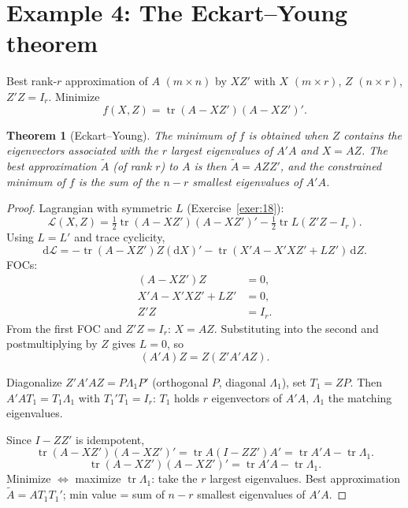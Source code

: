 \documentclass[14pt]{extarticle}
\theoremstyle{plain}
\newtheorem{theorem}{Theorem}
\theoremstyle{definition}
\theoremstyle{remark}
\DeclareMathOperator{\tr}{tr}
\newcommand{\dd}{\mathrm{d}}
\begin{document}
\section{Example 4: The Eckart--Young theorem}\label{sec:15}

Best rank-$r$ approximation of $A$ $(m\times n)$ by $XZ'$ with $X$ $(m\times r)$, $Z$ $(n\times r)$, $Z'Z = I_r$. Minimize
\begin{equation}\label{eq:53}
f(X, Z) = \tr(A - XZ')(A - XZ')'.
\end{equation}

\begin{theorem}[Eckart--Young]\label{thm:ey}
The minimum of $f$ is obtained when $Z$ contains the eigenvectors associated with the $r$ largest eigenvalues of $A'A$ and $X = AZ$. The best approximation $\tilde{A}$ (of rank $r$) to $A$ is then $\tilde{A} = AZZ'$, and the constrained minimum of $f$ is the sum of the $n - r$ smallest eigenvalues of $A'A$.
\end{theorem}

\begin{proof}
Lagrangian with symmetric $L$ (Exercise~\ref{exer:18}):
\begin{equation}\label{eq:54}
\mathcal{L}(X, Z) = \tfrac{1}{2}\tr(A - XZ')(A - XZ')' - \tfrac{1}{2}\tr L(Z'Z - I_r).
\end{equation}
Using $L = L'$ and trace cyclicity,
\[
\dd\mathcal{L} = -\tr(A - XZ')Z(\dd X)' - \tr(X'A - X'XZ' + LZ')\, \dd Z.
\]
FOCs:
\begin{equation}\label{eq:55}
\begin{aligned}
(A - XZ')Z &= 0, \\
X'A - X'XZ' + LZ' &= 0, \\
Z'Z &= I_r.
\end{aligned}
\end{equation}
From the first FOC and $Z'Z = I_r$: $X = AZ$. Substituting into the second and postmultiplying by $Z$ gives $L = 0$, so
\begin{equation}\label{eq:56}
(A'A)Z = Z(Z'A'AZ).
\end{equation}

Diagonalize $Z'A'AZ = P\Lambda_1 P'$ (orthogonal $P$, diagonal $\Lambda_1$), set $T_1 = ZP$. Then $A'AT_1 = T_1\Lambda_1$ with $T_1'T_1 = I_r$: $T_1$ holds $r$ eigenvectors of $A'A$, $\Lambda_1$ the matching eigenvalues.

Since $I - ZZ'$ is idempotent,
\[
\tr(A - XZ')(A - XZ')' = \tr A(I - ZZ')A' = \tr A'A - \tr\Lambda_1.
\]
\begin{equation}\label{eq:57}
\tr(A - XZ')(A - XZ')' = \tr A'A - \tr\Lambda_1.
\end{equation}
Minimize $\iff$ maximize $\tr\Lambda_1$: take the $r$ largest eigenvalues. Best approximation $\tilde A = AT_1T_1'$; min value = sum of $n-r$ smallest eigenvalues of $A'A$.
\end{proof}
\end{document}
